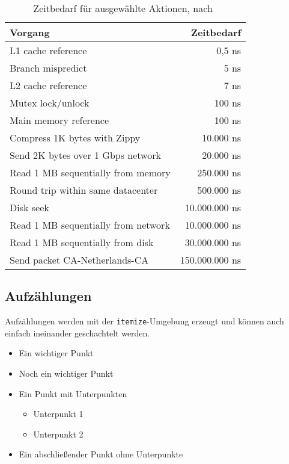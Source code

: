 \documentclass[conference,compsoc,final,a4paper]{IEEEtran}
\begin{document}
\begin{table}[!ht]
\centering
\rmfamily
\caption{Zeitbedarf für ausgewählte Aktionen, nach~\cite{Dean2012}}
\renewcommand{\arraystretch}{1.1}
\sffamily
\begin{footnotesize}
\begin{tabular}{l r}
\toprule
\textbf{Vorgang} & \textbf{Zeitbedarf} \\
\midrule
L1 cache reference                  & 0,5 ns\\
Branch mispredict                   & 5 ns\\
L2 cache reference                  & 7 ns\\
Mutex lock/unlock                   & 100 ns\\
Main memory reference               & 100 ns\\
Compress 1K bytes with Zippy        & 10.000 ns\\
Send 2K bytes over 1 Gbps network   & 20.000 ns\\
Read 1 MB sequentially from memory  & 250.000 ns\\
Round trip within same datacenter   & 500.000 ns\\
Disk seek                           & 10.000.000 ns\\
Read 1 MB sequentially from network & 10.000.000 ns\\
Read 1 MB sequentially from disk    & 30.000.000 ns\\
Send packet CA-Netherlands-CA       & 150.000.000 ns\\
\bottomrule
\end{tabular}
\end{footnotesize}
\label{google:numbers}
\end{table}

\subsection{Aufzählungen}
Aufzählungen werden mit der \texttt{itemize}-Umgebung erzeugt und können auch einfach ineinander geschachtelt werden.

\begin{itemize}
  \item Ein wichtiger Punkt
  \item Noch ein wichtiger Punkt
  \item Ein Punkt mit Unterpunkten
    \begin{itemize}
      \item Unterpunkt 1
      \item Unterpunkt 2
    \end{itemize}
  \item Ein abschließender Punkt ohne Unterpunkte
\end{itemize}
\end{document}
